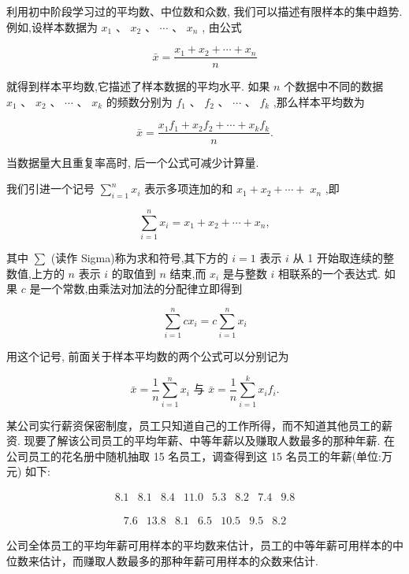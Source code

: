 \documentclass[10pt]{article}
\begin{document}
利用初中阶段学习过的平均数、中位数和众数, 我们可以描述有限样本的集中趋势. 例如,设样本数据为 \({x}_{1}\text{ 、 }{x}_{2}\text{ 、 }\cdots \text{ 、 }{x}_{n}\) , 由公式

\[
\bar{x} = \frac{{x}_{1} + {x}_{2} + \cdots  + {x}_{n}}{n}
\]

就得到样本平均数,它描述了样本数据的平均水平. 如果 \(n\) 个数据中不同的数据 \({x}_{1}\text{ 、 }{x}_{2}\text{ 、 }\cdots \text{ 、 }{x}_{k}\) 的频数分别为 \({f}_{1}\text{ 、 }{f}_{2}\text{ 、 }\cdots\) 、 \({f}_{k}\) ,那么样本平均数为

\[
\bar{x} = \frac{{x}_{1}{f}_{1} + {x}_{2}{f}_{2} + \cdots  + {x}_{k}{f}_{k}}{n}.
\]

当数据量大且重复率高时, 后一个公式可减少计算量.

我们引进一个记号 \(\mathop{\sum }\limits_{{i = 1}}^{n}{x}_{i}\) 表示多项连加的和 \({x}_{1} + {x}_{2} + \cdots  + \; {x}_{n}\) ,即

\[
\mathop{\sum }\limits_{{i = 1}}^{n}{x}_{i} = {x}_{1} + {x}_{2} + \cdots  + {x}_{n},
\]

其中 \(\sum\) (读作 Sigma)称为求和符号,其下方的 \(i = 1\) 表示 \(i\) 从 1 开始取连续的整数值,上方的 \(n\) 表示 \(i\) 的取值到 \(n\) 结束,而 \({x}_{i}\) 是与整数 \(i\) 相联系的一个表达式. 如果 \(c\) 是一个常数,由乘法对加法的分配律立即得到

\[
\mathop{\sum }\limits_{{i = 1}}^{n}c{x}_{i} = c\mathop{\sum }\limits_{{i = 1}}^{n}{x}_{i}
\]

用这个记号, 前面关于样本平均数的两个公式可以分别记为

\[
\bar{x} = \frac{1}{n}\mathop{\sum }\limits_{{i = 1}}^{n}{x}_{i}\text{ 与 }\bar{x} = \frac{1}{n}\mathop{\sum }\limits_{{i = 1}}^{k}{x}_{i}{f}_{i}.
\]

某公司实行薪资保密制度，员工只知道自己的工作所得，而不知道其他员工的薪资. 现要了解该公司员工的平均年薪、中等年薪以及赚取人数最多的那种年薪. 在公司员工的花名册中随机抽取 15 名员工，调查得到这 15 名员工的年薪(单位:万元) 如下:

\[
\begin{array}{llllllll} {8.1} & {8.1} & {8.4} & {11.0} & {5.3} & {8.2} & {7.4} & {9.8} \end{array}
\]

\[
\begin{array}{lllllll} {7.6} & {13.8} & {8.1} & {6.5} & {10.5} & {9.5} & {8.2} \end{array}
\]

公司全体员工的平均年薪可用样本的平均数来估计，员工的中等年薪可用样本的中位数来估计，而赚取人数最多的那种年薪可用样本的众数来估计.
\end{document}
